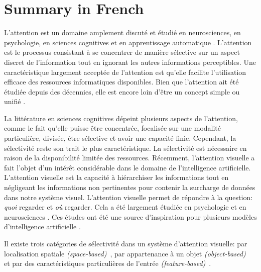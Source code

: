 
\chapter{Summary in French}

\startcontents[chapters]
\color{blue}

\color{black}
L'attention est un domaine amplement discut\'e et \'etudi\'e en neurosciences, en psychologie, en sciences cognitives et en apprentissage automatique \citep{chun2011taxonomy,cho2015describing}. L'attention est le processus consistant \`a se concentrer de manière s\'elective sur un aspect discret de l'information tout en ignorant les autres informations perceptibles. Une caract\'eristique largement accept\'ee de l'attention est qu'elle facilite l'utilisation efficace des ressources informatiques disponibles.
Bien que l'attention ait \'et\'e \'etudi\'ee depuis des d\'ecennies, elle est encore loin d'\^etre un concept simple ou unifi\'e \citep{lindsay2020attention}.

La litt\'erature en sciences cognitives d\'epeint plusieurs aspects de l'attention, comme le fait qu'elle puisse \^etre concentr\'ee, focalisée sur une modalit\'e particuli\`ere, divis\'ee, \^etre s\'elective et avoir une capacit\'e finie. Cependant, la s\'electivit\'e reste son trait le plus caract\'eristique. La s\'electivit\'e est n\'ecessaire en raison de la disponibilit\'e limit\'ee des ressources. R\'ecemment, l'attention visuelle a fait l'objet d'un intérêt consid\'erable dans le domaine de l'intelligence artificielle. L'attention visuelle \citep{ahmad1991visit} est la capacit\'e \`a hi\'erarchiser les informations tout en n\'egligeant les informations non pertinentes pour contenir la surcharge de donn\'ees dans notre syst\`eme visuel. L'attention visuelle permet de r\'epondre \`a la question: \textit{quoi} regarder et \textit{où} regarder. Cela a \'et\'e largement \'etudi\'ee en psychologie et en neurosciences \citep{posner1990attention,bundesen1990theory,desimone1995neural,corbetta2002control,petersen2012attention}. Ces \'etudes ont \'et\'e une source d'inspiration pour plusieurs mod\`eles d'intelligence artificielle \citep{khosla2007bio,lindsay2018biological,vaishnav2021understanding,vaishnav2022mareo}. 

Il existe trois cat\'egories de s\'electivit\'e dans un syst\`eme d'attention visuelle: par localisation spatiale \textit{(space-based)}~\citep{posner1980orienting,posner1982neural}, par appartenance \`a un objet \textit{(object-based)}~\citep{duncan1984selective,egly1994shifting,vecera1994does,kramer1997object} et par des caract\'eristiques particuli\`eres de l'entr\'ee \textit{(feature-based)}~\citep{harms1983color,driver1989movement,kramer1991perceptual,baylis1992visual,duncan1996objects}. 

